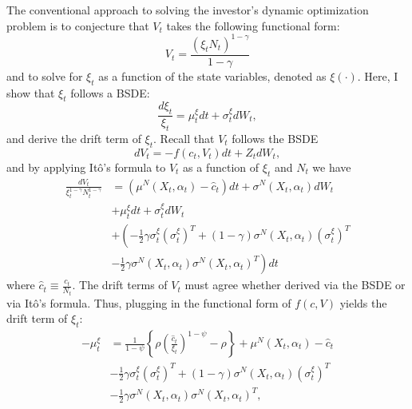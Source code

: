 \documentclass{article}
\begin{document}
The conventional approach to solving the investor's dynamic optimization problem is to conjecture that $V_{t}$ takes the following functional form:
\[
V_{t}=\frac{(\xi_{t}N_{t})^{1-\gamma}}{1-\gamma}
\]
and to solve for $\xi_{t}$ as a function of the state variables, denoted as $\xi(\cdot)$. Here, I show that $\xi_{t}$ follows a BSDE:
\[
\frac{d\xi_{t}}{\xi_{t}}=\mu_{t}^{\xi}dt+\sigma_{t}^{\xi}dW_{t},
\]
and derive the drift term of $\xi_{t}$. Recall that $V_{t}$ follows the BSDE
\[
dV_{t}=-f(c_{t},V_{t})dt+Z_{t}dW_{t},
\]
and by applying Itô's formula to $V_{t}$ as a function of $\xi_{t}$ and $N_{t}$ we have
\begin{align*}
\frac{dV_{t}}{\xi_{t}^{1-\gamma}N_{t}^{1-\gamma}}&=(\mu^{N}(X_{t},\alpha_{t})-\hat{c}_{t})dt+\sigma^{N}(X_{t},\alpha_{t})dW_{t} \\
&+\mu_{t}^{\xi}dt+\sigma_{t}^{\xi}dW_{t} \\
&+\left(-\frac{1}{2}\gamma\sigma_{t}^{\xi}(\sigma_{t}^{\xi})^{T}+(1-\gamma)\sigma^{N}(X_{t},\alpha_{t})(\sigma_{t}^{\xi})^{T} \right. \\
&\left.-\frac{1}{2}\gamma\sigma^{N}(X_{t},\alpha_{t})\sigma^{N}(X_{t},\alpha_{t})^{T}\right)dt
\end{align*}
where $\hat{c}_{t}\equiv\frac{c_{t}}{N_{t}}$. The drift terms of $V_{t}$ must agree whether derived via the BSDE or via Itô's formula. Thus, plugging in the functional form of $f(c,V)$ yields the drift term of $\xi_{t}$:
\begin{equation}
\begin{aligned}
-\mu_{t}^{\xi}&=\frac{1}{1-\psi}\left\{\rho\left(\frac{\hat{c}_{t}}{\xi_{t}}\right)^{1-\psi}-\rho\right\}+\mu^{N}(X_{t},\alpha_{t})-\hat{c}_{t} \\
&-\frac{1}{2}\gamma\sigma_{t}^{\xi}(\sigma_{t}^{\xi})^{T}+(1-\gamma)\sigma^{N}(X_{t},\alpha_{t})(\sigma_{t}^{\xi})^{T} \\
&-\frac{1}{2}\gamma\sigma^{N}(X_{t},\alpha_{t})\sigma^{N}(X_{t},\alpha_{t})^{T},
\end{aligned}
\label{eq:26}
\end{equation}

\clearpage
\end{document}
